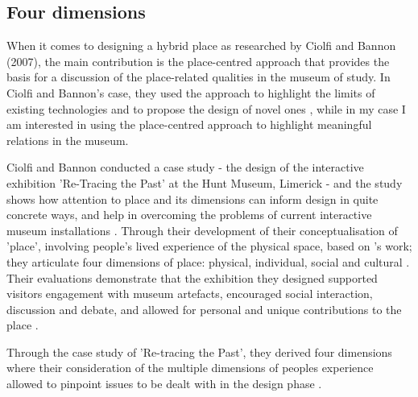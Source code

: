 \subsection{Four dimensions}
When it comes to designing a hybrid place as researched by Ciolfi and Bannon (2007), the main contribution is the place-centred approach that provides the basis for a discussion of the place-related qualities in the museum of study. In Ciolfi and Bannon's case, they used the approach to highlight the limits of existing technologies and to propose the design of novel ones \autocite[p. 163]{hybridplace_ciolfi}, while in my case I am interested in using the place-centred approach to highlight meaningful relations in the museum.

Ciolfi and Bannon conducted a case study - the design of the interactive exhibition 'Re-Tracing the Past' at the Hunt Museum, Limerick - and the study shows how attention to place and its dimensions can inform design in quite concrete ways, and help in overcoming the problems of current interactive museum installations \autocite[p. 178]{hybridplace_ciolfi}. Through their development of their conceptualisation of 'place', involving people's lived experience of the physical space, based on \autocite{Tuan_book}'s work; they articulate four dimensions of place: physical, individual, social and cultural \autocite[p. 178]{hybridplace_ciolfi}. Their evaluations demonstrate that the exhibition they designed supported visitors engagement with museum artefacts, encouraged social interaction, discussion and debate, and allowed for personal and unique contributions to the place \autocite[p. 178]{hybridplace_ciolfi}.

\par
Through the case study of 'Re-tracing the Past', they derived four dimensions where their consideration of the multiple dimensions of peoples experience allowed to pinpoint issues to be dealt with in the design phase \autocite[p. 178]{hybridplace_ciolfi}.

